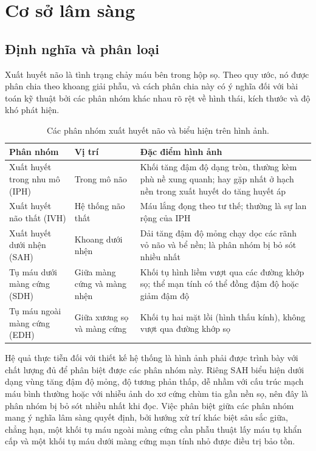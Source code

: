 \section{Cơ sở lâm sàng}
\label{sec:clinical}

\subsection{Định nghĩa và phân loại}

Xuất huyết não là tình trạng chảy máu bên trong hộp sọ. Theo quy ước, nó được
phân chia theo khoang giải phẫu, và cách phân chia này có ý nghĩa đối với bài
toán kỹ thuật bởi các phân nhóm khác nhau rõ rệt về hình thái, kích thước và độ
khó phát hiện.

\begin{table}[H]
\centering
\small
\begin{tabularx}{\textwidth}{@{}l l X@{}}
\toprule
\textbf{Phân nhóm} & \textbf{Vị trí} & \textbf{Đặc điểm hình ảnh} \\
\midrule
Xuất huyết trong nhu mô (IPH) & Trong mô não & Khối tăng đậm độ dạng tròn, thường kèm phù nề xung quanh; hay gặp nhất ở hạch nền trong xuất huyết do tăng huyết áp \\
Xuất huyết não thất (IVH) & Hệ thống não thất & Máu lắng đọng theo tư thế; thường là sự lan rộng của IPH \\
Xuất huyết dưới nhện (SAH) & Khoang dưới nhện & Dải tăng đậm độ mỏng chạy dọc các rãnh vỏ não và bể nền; là phân nhóm bị bỏ sót nhiều nhất \\
Tụ máu dưới màng cứng (SDH) & Giữa màng cứng và màng nhện & Khối tụ hình liềm vượt qua các đường khớp sọ; thể mạn tính có thể đồng đậm độ hoặc giảm đậm độ \\
Tụ máu ngoài màng cứng (EDH) & Giữa xương sọ và màng cứng & Khối tụ hai mặt lồi (hình thấu kính), không vượt qua đường khớp sọ \\
\bottomrule
\end{tabularx}
\caption{Các phân nhóm xuất huyết não và biểu hiện trên hình ảnh.}
\label{tab:subtypes}
\end{table}

Hệ quả thực tiễn đối với thiết kế hệ thống là hình ảnh phải được trình bày với
chất lượng đủ để phân biệt được các phân nhóm này. Riêng SAH biểu hiện dưới
dạng vùng tăng đậm độ mỏng, độ tương phản thấp, dễ nhầm với cấu trúc mạch máu
bình thường hoặc với nhiễu ảnh do xơ cứng chùm tia gần nền sọ, nên đây là phân
nhóm bị bỏ sót nhiều nhất khi đọc. Việc phân biệt giữa các phân nhóm mang ý
nghĩa lâm sàng quyết định, bởi hướng xử trí khác biệt sâu sắc giữa, chẳng hạn,
một khối tụ máu ngoài màng cứng cần phẫu thuật lấy máu tụ khẩn cấp và một khối
tụ máu dưới màng cứng mạn tính nhỏ được điều trị bảo tồn.

